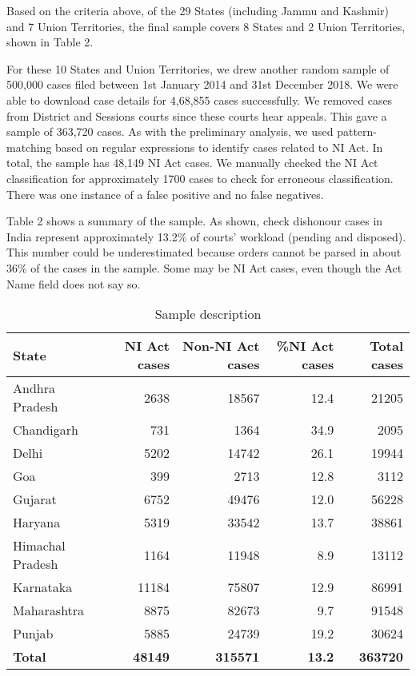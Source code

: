 \documentclass[12pt,a4paper]{article}
\begin{document}
Based on the criteria above, of the 29 States (including Jammu and Kashmir) and 7 Union Territories, the final sample covers 8 States and 2 Union Territories, shown in Table 2. 

For these 10 States and Union Territories, we drew another random sample of 500,000 cases filed between 1st January 2014 and 31st December 2018. We were able to download case details for 4,68,855 cases successfully. We removed cases from District and Sessions courts since these courts hear appeals. This gave a sample of 363,720 cases. As with the preliminary analysis, we used pattern-matching based on regular expressions to identify cases related to NI Act. In total, the sample has 48,149 NI Act cases. We manually checked the NI Act classification for approximately 1700 cases to check for erroneous classification. There was one instance of a false positive and no false negatives. 

Table 2 shows a summary of the sample. As shown, check dishonour cases in India represent approximately 13.2\% of courts’ workload (pending and disposed). This number could be underestimated because orders cannot be parsed in about 36\% of the cases in the sample. Some may be NI Act cases, even though the Act Name field does not say so.

{\footnotesize \begin{longtable}{@{}lrrr|r@{}}
\caption{Sample description}
\label{tab:sample_desc}\\
\toprule
\textbf{State} & \textbf{NI Act cases} & \textbf{Non-NI Act cases} & \textbf{\%NI Act cases} & \textbf{Total cases}\\ \midrule
\endhead
Andhra Pradesh & 2638 & 18567 & 12.4 & 21205\\
Chandigarh & 731 & 1364 & 34.9 & 2095\\
Delhi & 5202 & 14742 & 26.1 & 19944\\
Goa & 399 & 2713 & 12.8 & 3112\\
Gujarat & 6752 & 49476 & 12.0 & 56228\\
Haryana & 5319 & 33542 & 13.7 & 38861\\
Himachal Pradesh & 1164 & 11948 & 8.9 & 13112\\
Karnataka & 11184 & 75807 & 12.9 & 86991\\
Maharashtra & 8875 & 82673 & 9.7 & 91548\\
Punjab & 5885 & 24739 & 19.2 & 30624\\
\midrule
\textbf{Total} & \textbf{48149} & \textbf{315571} & \textbf{13.2} & \textbf{363720}\\ \bottomrule
\end{longtable}
}
\end{document}
